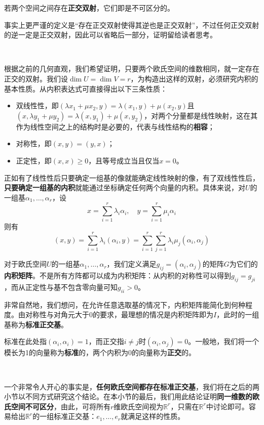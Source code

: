 \documentclass[a4paper,UTF8,fontset=windows]{ctexart}
\newcommand*{\note}{\noindent *}
\begin{document}
若两个空间之间存在\textbf{正交双射}，它们即是不可区分的。

\note 事实上更严谨的定义是``存在正交双射使得其逆也是正交双射''，不过任何正交双射的逆一定是正交双射，因此可以省略后一部分，证明留给读者思考。

\

根据之前的几何直观，我们希望证明，只要两个欧氏空间的维数相同，就一定存在正交的双射。我们设$\dim U=\dim V=r$，为构造出这样的双射，必须研究内积的基本性质。从内积表达式可直接得出以下三条性质：
\begin{itemize}
    \item 双线性性，即$(\lambda x_1+\mu x_2,y)=\lambda(x_1,y)+\mu(x_2,y)$且$(x,\lambda y_1+\mu y_2)=\lambda(x,y_1)+\mu(x,y_2)$，对两个分量都是线性映射，这在其作为线性空间之上的结构时是必要的，代表与线性结构的\textbf{相容}；
    \item 对称性，即$(x,y)=(y,x)$；
    \item 正定性，即$(x,x)\ge0$，且等号成立当且仅当$x=0$。
\end{itemize}

正如有了线性性后只要确定一组基的像就能确定线性映射的像，有了双线性性后，\textbf{只要确定一组基的内积}就能通过坐标确定任何两个向量的内积。具体来说，对$U$的一组基$\alpha_1,\dots,\alpha_r$，设
$$x=\sum_{i=1}^r\lambda_i\alpha_i,\quad y=\sum_{i=1}^r\mu_i\alpha_i$$
则有
$$(x,y)=\sum_{i=1}^r\lambda_i(\alpha_i,y)=\sum_{i=1}^r\sum_{j=1}^r\lambda_i\mu_j(\alpha_i,\alpha_j)$$

对于欧氏空间$U$的一组基$\alpha_1,\dots,\alpha_r$，我们定义满足$g_{ij}=(\alpha_i,\alpha_j)$的矩阵$G$为它们的\textbf{内积矩阵}。不是所有方阵都可以成为内积矩阵：从内积的对称性可以得到$g_{ij}=g_{ji}$，而从正定性与基不包含零向量可知$g_{ii}>0$。

非常自然地，我们想问，在允许任意选取基的情况下，内积矩阵能简化到何种程度。由对称性与对角元大于0的要求，最理想的情况是内积矩阵即为$I$，此时的一组基称为\textbf{标准正交基}。

\note 标准在此处指$(\alpha_i,\alpha_i)=1$，而正交指$i\ne j$时$(\alpha_i,\alpha_j)=0$。一般地，我们将一个模长为1的向量称为\textbf{标准}的，两个内积为0的向量称为\textbf{正交}的。

\

一个非常令人开心的事实是，\textbf{任何欧氏空间都存在标准正交基}，我们将在之后的两小节以不同方式研究这个结论。在本小节的最后，我们用此结论证明\textbf{同一维数的欧氏空间不可区分}，由此，可将所有$r$维欧氏空间视为$\mathbb{R}^r$，只需在$\mathbb{R}^r$中讨论即可。容易给出$\mathbb{R}^r$的一组标准正交基：$e_1,\dots,e_r$就满足这样的性质。
\end{document}
